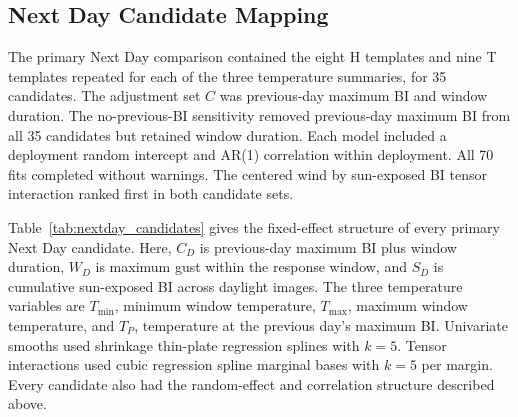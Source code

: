 \documentclass[insects,article,submit,pdftex,moreauthors]{Definitions/mdpi}
\begin{document}
\begin{appendix}
\subsection{Next Day Candidate Mapping}
\label{app:nextday_models}

The primary Next Day comparison contained the eight H templates and nine T templates repeated for each of the three temperature summaries, for 35 candidates. The adjustment set $C$ was previous-day maximum BI and window duration. The no-previous-BI sensitivity removed previous-day maximum BI from all 35 candidates but retained window duration. Each model included a deployment random intercept and AR(1) correlation within deployment. All 70 fits completed without warnings. The centered wind by sun-exposed BI tensor interaction ranked first in both candidate sets.

Table~\ref{tab:nextday_candidates} gives the fixed-effect structure of every primary Next Day candidate. Here, $C_D$ is previous-day maximum BI plus window duration, $W_D$ is maximum gust within the response window, and $S_D$ is cumulative sun-exposed BI across daylight images. The three temperature variables are $T_{\min}$, minimum window temperature, $T_{\max}$, maximum window temperature, and $T_P$, temperature at the previous day's maximum BI. Univariate smooths used shrinkage thin-plate regression splines with $k=5$. Tensor interactions used cubic regression spline marginal bases with $k=5$ per margin. Every candidate also had the random-effect and correlation structure described above.


\end{appendix}
\end{document}
